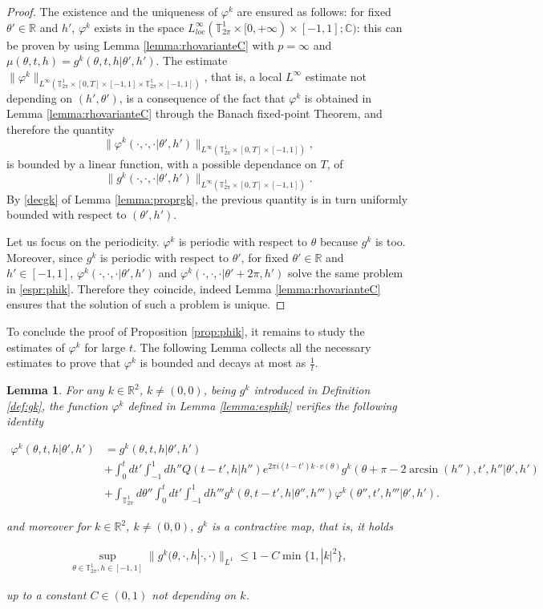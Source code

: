 \documentclass[a4paper,10pt,reqno]{amsart}
\newtheorem{lemma}{Lemma}[section]
\numberwithin{equation}{subsection}
\numberwithin{figure}{subsection}
\begin{document}
\begin{proof}
The existence and the uniqueness of $\varphi^k$ are ensured as follows: for fixed $\theta'\in\mathbb{R}$ and $h'$, $\varphi^k$ exists  in the space $L^{\infty}_{loc}(\mathbb{T}^1_{2\pi}\times[0,+\infty)\times[-1,1];\mathbb{C})$: this can be proven by using Lemma \ref{lemma:rhovarianteC} with $p=\infty$ and $\mu(\theta,t,h)=g^k(\theta,t,h|\theta',h')$. The estimate $\|\varphi^k\|_{L^{\infty}(\mathbb{T}^1_{2\pi}\times[0,T]\times[-1,1]\times\mathbb{T}^1_{2\pi}\times[-1,1])}$, that is, a local $L^{\infty}$ estimate not depending on $(h',\theta')$, is a consequence of the fact that $\varphi^k$ is obtained in Lemma \ref{lemma:rhovarianteC} through the Banach fixed-point Theorem, and therefore the quantity
\[
\|\varphi^k(\cdot,\cdot,\cdot|\theta',h')\|_{L^{\infty}(\mathbb{T}^1_{2\pi}\times[0,T]\times[-1,1])},
\]
is bounded by a linear function, with a possible dependance on $T$, of
\[
\|g^k(\cdot,\cdot,\cdot|\theta',h')\|_{L^{\infty}(\mathbb{T}^1_{2\pi}\times[0,T]\times[-1,1])}.
\]
By \eqref{decgk} of Lemma \ref{lemma:proprgk}, the previous quantity is in turn uniformly bounded with respect to $(\theta',h')$.

Let us focus on the periodicity. $\varphi^k$ is periodic with respect to $\theta$ because $g^k$ is too. Moreover, since $g^k$ is periodic with respect to $\theta'$, for fixed $\theta'\in\mathbb{R}$ and $h'\in[-1,1]$, $\varphi^k(\cdot,\cdot,\cdot|\theta',h')$ and $\varphi^k(\cdot,\cdot,\cdot|\theta'+2\pi,h')$ solve the same problem in \eqref{espr:phik}. Therefore they coincide, indeed Lemma \ref{lemma:rhovarianteC} ensures that the solution of such a problem is unique.
\end{proof}
To conclude the proof of Proposition \ref{prop:phik}, it remains to study the estimates of $\varphi^k$ for large $t$. The following Lemma collects all the necessary estimates to prove that $\varphi^k$ is bounded and decays at most as $\frac{1}{t}$.
\begin{lemma}\label{lemma:raccolta}
For any $k\in\mathbb{R}^2$, $k\neq(0,0)$, being $g^k$ introduced in Definition \ref{def:gk}, the function $\varphi^k$ defined in Lemma \ref{lemma:esphik} verifies the following identity

{\scriptsize\begin{align}
\nonumber\varphi^k(\theta,t,h|\theta',h')&=g^k(\theta,t,h|\theta',h')
\\
\nonumber&+\int_0^tdt'\int_{-1}^1dh''Q(t-t',h|h'')e^{2\pi i(t-t')k\cdot v(\theta)}g^k(\theta+\pi-2\arcsin(h''),t',h''|\theta',h')
\\
\label{phikreiter}&+\int_{\mathbb{T}^1_{2\pi}}d\theta''\int_0^tdt'\int_{-1}^1dh'''g^k(\theta,t-t',h|\theta'',h''')\varphi^k(\theta'',t',h'''|\theta',h').
\end{align}}

and moreover for $k\in\mathbb{R}^2$, $k\neq(0,0)$, $g^k$ is a contractive map, that is, it holds

\begin{align}
\label{gkcontrae}\sup_{\theta\in\mathbb{T}^1_{2\pi},h\in[-1,1]}\|g^k(\theta,\cdot,h|\cdot,\cdot)\|_{L^1}\leq1-C\min\{1,|k|^2\},
\end{align}

up to a constant $C\in(0,1)$ not depending on $k$.
\end{lemma}
\end{document}

